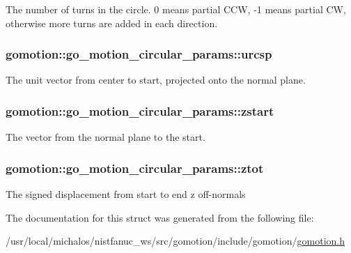 The number of turns in the circle. 0 means partial C\-C\-W, -\/1 means partial C\-W, otherwise more turns are added in each direction. \hypertarget{structgomotion_1_1go__motion__circular__params_ab97f8ccebf3ca78e2be4a4adfe9c9e8c}{
\subsubsection[{urcsp}]{ gomotion\-::go\-\_\-motion\-\_\-circular\-\_\-params\-::urcsp}}\label{structgomotion_1_1go__motion__circular__params_ab97f8ccebf3ca78e2be4a4adfe9c9e8c}
The unit vector from center to start, projected onto the normal plane. \hypertarget{structgomotion_1_1go__motion__circular__params_a3638d197aac3d27862052befae408e94}{
\subsubsection[{zstart}]{ gomotion\-::go\-\_\-motion\-\_\-circular\-\_\-params\-::zstart}}\label{structgomotion_1_1go__motion__circular__params_a3638d197aac3d27862052befae408e94}
The vector from the normal plane to the start. \hypertarget{structgomotion_1_1go__motion__circular__params_a1572625c5322b3ace560429703948191}{
\subsubsection[{ztot}]{ gomotion\-::go\-\_\-motion\-\_\-circular\-\_\-params\-::ztot}}\label{structgomotion_1_1go__motion__circular__params_a1572625c5322b3ace560429703948191}
The signed displacement from start to end z off-\/normals 

The documentation for this struct was generated from the following file\-:\begin{DoxyCompactItemize}
\item 
/usr/local/michalos/nistfanuc\-\_\-ws/src/gomotion/include/gomotion/\hyperlink{gomotion_8h}{gomotion.\-h}\end{DoxyCompactItemize}
